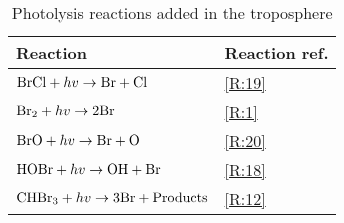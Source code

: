\begin{table}[ht]
\centering
\begin{tabular}{|l|l|}
\hline
\textbf{Reaction}                                             & \textbf{Reaction ref.} \\ \hline
$\mathrm{BrCl} + hv \rightarrow \mathrm{Br} + \mathrm{Cl}$          & \ref{R:19}             \\
$\mathrm{Br_2} + hv \rightarrow 2\mathrm{Br}$                     & \ref{R:1}              \\
$\mathrm{BrO} + hv \rightarrow \mathrm{Br} + \mathrm{O}$                & \ref{R:20}             \\
$\mathrm{HOBr} + hv \rightarrow \mathrm{OH} + \mathrm{Br}$          & \ref{R:18}             \\
$\mathrm{CHBr_3} + hv \rightarrow 3\mathrm{Br} + \text{Products}$ & \ref{R:12}             \\ \hline
\end{tabular}
\caption{Photolysis reactions added in the troposphere}
\label{tab:photolysis_reactions}
\end{table}